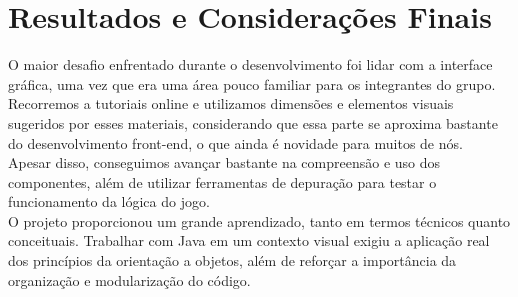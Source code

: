 \documentclass[a4paper, 12pt]{article}
\begin{document}
\section{Resultados e Considerações Finais}

O maior desafio enfrentado durante o desenvolvimento foi lidar com a interface gráfica, uma vez que era uma área pouco familiar para os integrantes do grupo. Recorremos a tutoriais online e utilizamos dimensões e elementos visuais sugeridos por esses materiais, considerando que essa parte se aproxima bastante do desenvolvimento front-end, o que ainda é novidade para muitos de nós. \\

Apesar disso, conseguimos avançar bastante na compreensão e uso dos componentes, além de utilizar ferramentas de depuração para testar o funcionamento da lógica do jogo. \\

O projeto proporcionou um grande aprendizado, tanto em termos técnicos quanto conceituais. Trabalhar com Java em um contexto visual exigiu a aplicação real dos princípios da orientação a objetos, além de reforçar a importância da organização e modularização do código.
\end{document}
